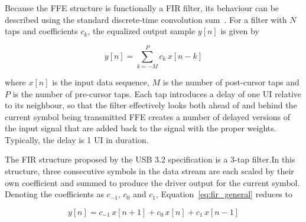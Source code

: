 Because the \ac{FFE} structure is functionally a \ac{FIR} filter, its behaviour can be described using the standard discrete-time convolution sum~\cite{chen_tx_equalizer_2009}. For a filter with $N$ taps and coefficients $c_k$, the equalized output sample $y[n]$ is given by

\begin{equation}
y[n] = \sum_{k=-M}^{P} c_k \, x[n-k]
\label{eq:fir_general}
\end{equation}

where $x[n]$ is the input data sequence, $M$ is the number of post-cursor taps and $P$ is the number of pre-cursor taps. Each tap introduces a delay of one \ac{UI} relative to its neighbour, so that the filter effectively looks both ahead of and behind the current symbol being transmitted \ac{FFE} creates a number of delayed versions of the input signal that are added back to the signal with the proper weights. Typically, the delay is 1 \ac{UI} in duration.


The \ac{FIR} structure proposed by the \ac{USB} 3.2 specification is a 3-tap filter.In this structure, three consecutive symbols in the data stream are each scaled by their own coefficient and summed to produce the driver output for the current symbol. Denoting the coefficients as $c_{-1}$, $c_0$ and $c_1$, Equation~\eqref{eq:fir_general} reduces to

\begin{equation}
y[n] = c_{-1}\,x[n+1] + c_0\,x[n] + c_1\,x[n-1]
\label{eq:fir_3tap}
\end{equation}

